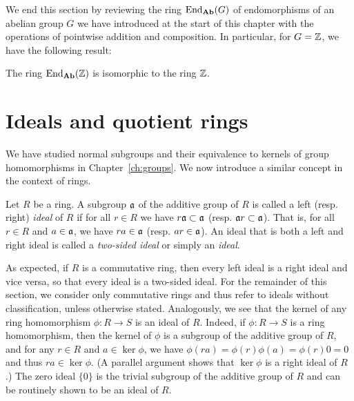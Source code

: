\bigskip

We end this section by reviewing the ring \(\operatorname{End}_{\mathbf{Ab}}(G)\) of endomorphisms of
an abelian group \(G\) we have introduced at the start of this chapter with the
operations of pointwise addition and composition. In particular, for \(G = \mathbb{Z}\),
we have the following result:

\begin{theorem}
    The ring \(\operatorname{End}_{\mathbf{Ab}}(\mathbb{Z})\) is isomorphic to the ring \(\mathbb{Z}\).
\end{theorem}

\section{Ideals and quotient rings}
\label{sec:ideals}

We have studied normal subgroups and their equivalence to kernels of group
homomorphisms in Chapter~\ref{ch:groups}. We now introduce a similar concept in
the context of rings.

\begin{definition}[Ideal]
    \label{def:ideal}
    Let \(R\) be a ring. A subgroup \(\mathfrak{a}\) of the additive group of \(R\)
    is called a left (resp. right) \emph{ideal} of \(R\) if for all \(r \in R\)
    we have \(r\mathfrak{a} \subset \mathfrak{a}\) (resp. \(\mathfrak{a}r \subset \mathfrak{a}\)).
    That is, for all \(r \in R\) and \(a \in \mathfrak{a}\), we have \(ra \in
    \mathfrak{a}\) (resp. \(ar \in \mathfrak{a}\)). An ideal that is both a left and right
    ideal is called a \emph{two-sided ideal} or simply an \emph{ideal}.
\end{definition}

As expected, if \(R\) is a commutative ring, then every left ideal is a right
ideal and vice versa, so that every ideal is a two-sided ideal. For the
remainder of this section, we consider only commutative rings and thus refer to
ideals without classification, unless otherwise stated. Analogously, we see that
the kernel of any ring homomorphism \(\phi: R \to S\) is an ideal of \(R\).
Indeed, if \(\phi: R \to S\) is a ring homomorphism, then the kernel of \(\phi\)
is a subgroup of the additive group of \(R\), and for any \(r \in R\) and \(a
\in \ker \phi\), we have \(\phi(ra) = \phi(r)\phi(a) = \phi(r)0 = 0\) and thus
\(ra \in \ker \phi\). (A parallel argument shows that \(\ker \phi\) is a right
ideal of \(R\).) The zero ideal \(\{0\}\) is the trivial subgroup of the
additive group of \(R\) and can be routinely shown to be an ideal of \(R\).

